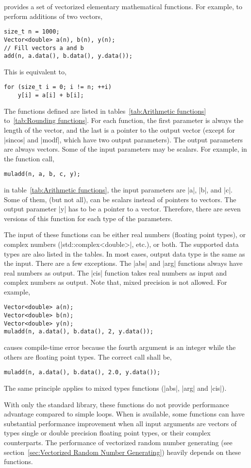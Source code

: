 \mckl provides a set of vectorized elementary mathematical functions. For
example, to perform additions of two vectors,
\begin{verbatim}
size_t n = 1000;
Vector<double> a(n), b(n), y(n);
// Fill vectors a and b
add(n, a.data(), b.data(), y.data());
\end{verbatim}
This is equivalent to,
\begin{verbatim}
for (size_t i = 0; i != n; ++i)
    y[i] = a[i] + b[i];
\end{verbatim}
The functions defined are listed in tables~\ref{tab:Arithmetic functions}
to~\ref{tab:Rounding functions}. For each function, the first parameter is
always the length of the vector, and the last is a pointer to the output vector
(except for |sincos| and |modf|, which have two output parameters). The output
parameters are always vectors. Some of the input parameters may be scalars. For
example, in the function call,
\begin{verbatim}
muladd(n, a, b, c, y);
\end{verbatim}
in table~\ref{tab:Arithmetic functions}, the input parameters are |a|, |b|, and
|c|. Some of them, (but not all), can be scalars instead of pointers to
vectors. The output parameter |y| has to be a pointer to a vector. Therefore,
there are seven versions of this function for each type of the parameters.

The input of these functions can be either real numbers (floating point types),
or complex numbers (|std::complex<double>|, etc.), or both. The supported data
types are also listed in the tables. In most cases, output data type is the
same as the input. There are a few exceptions. The |abs| and |arg| functions
always have real numbers as output. The |cis| function takes real numbers as
input and complex numbers as output. Note that, mixed precision is not allowed.
For example,
\begin{verbatim}
Vector<double> a(n);
Vector<double> b(n);
Vector<double> y(n);
muladd(n, a.data(), b.data(), 2, y.data());
\end{verbatim}
causes compile-time error because the fourth argument is an integer while the
others are floating point types. The correct call shall be,
\begin{verbatim}
muladd(n, a.data(), b.data(), 2.0, y.data());
\end{verbatim}
The same principle applies to mixed types functions (|abs|, |arg| and |cis|).

With only the standard library, these functions do not provide performance
advantage compared to simple loops. When \mkl \vml is available, some functions
can have substantial performance improvement when all input arguments are
vectors of types single or double precision floating point types, or their
complex counterparts. The performance of vectorized random number generating
(see section~\ref{sec:Vectorized Random Number Generating}) heavily depends on
these functions.

